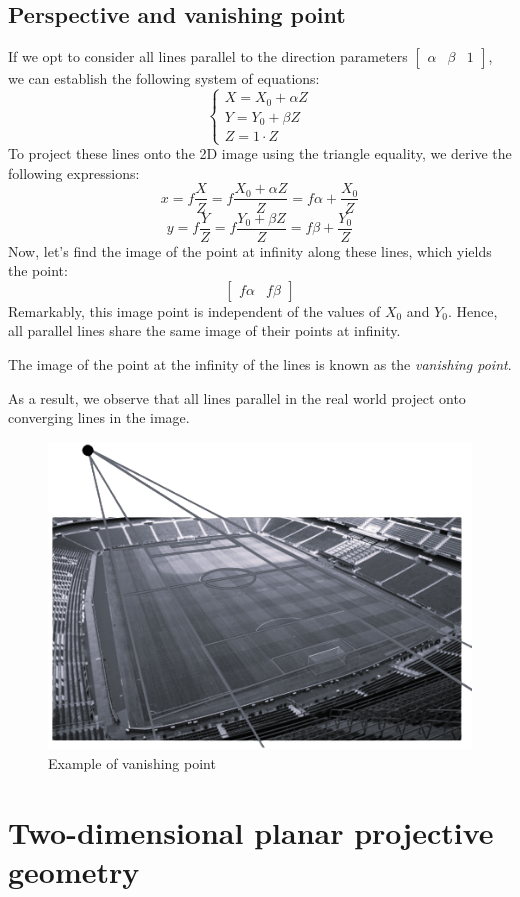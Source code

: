 \documentclass[12pt, a4paper]{report}
\begin{document}
    \section{Perspective and vanishing point}
    If we opt to consider all lines parallel to the direction parameters $\begin{bmatrix} \alpha & \beta & 1 \end{bmatrix}$, we can establish the following system of equations:
    \[
        \begin{cases}
            X = X_0 + \alpha Z  \\
            Y = Y_0 + \beta Z   \\
            Z = 1 \cdot Z
        \end{cases}
    \]
    To project these lines onto the 2D image using the triangle equality, we derive the following expressions:
    \[x=f \dfrac{X}{Z} = f \dfrac{X_0 + \alpha Z}{Z} = f\alpha + \dfrac{X_0}{Z}\]
    \[y=f \dfrac{Y}{Z} = f \dfrac{Y_0 + \beta Z}{Z}  = f\beta  + \dfrac{Y_0}{Z}\]
    Now, let's find the image of the point at infinity along these lines, which yields the point:
    \[\begin{bmatrix} f\alpha & f\beta \end{bmatrix}\]
    Remarkably, this image point is independent of the values of $X_0$ and $Y_0$. 
    Hence, all parallel lines share the same image of their points at infinity.
    \newpage
    \begin{definition}
        The image of the point at the infinity of the lines is known as the \emph{vanishing point}. 
    \end{definition}
    As a result, we observe that all lines parallel in the real world project onto converging lines in the image.
    \begin{figure}[H]
        \centering
        \includegraphics[width=0.4\linewidth]{images/vanishingpoint.png}
        \caption{Example of vanishing point}
    \end{figure}
    
\newpage

\chapter{Two-dimensional planar projective geometry}
\end{document}
